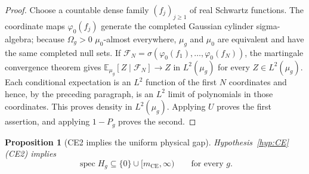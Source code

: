 \documentclass[11pt,a4paper]{article}
\newtheorem{proposition}[theorem]{Proposition}
\theoremstyle{remark}
\newcommand{\Om}{\Omega}
\newcommand{\E}{\mathbb E}
\newcommand{\CE}{\mathrm{CE}}
\DeclareMathOperator{\spec}{spec}
\begin{document}
\begin{proof}
Choose a countable dense family $(f_j)_{j\ge1}$ of real Schwartz functions.  The coordinate
maps $\varphi_0(f_j)$ generate the completed Gaussian cylinder sigma-algebra; because
$\Om_g>0$ $\mu_0$-almost everywhere, $\mu_g$ and $\mu_0$ are equivalent and have the same
completed null sets.  If $\mathcal F_N=\sigma(\varphi_0(f_1),\ldots,\varphi_0(f_N))$, the
martingale convergence theorem gives
\(
 \E_{\mu_g}[Z\mid\mathcal F_N]\to Z
\)
in $L^2(\mu_g)$ for every $Z\in L^2(\mu_g)$.  Each conditional expectation is an $L^2$
function of the first $N$ coordinates and hence, by the preceding paragraph, is an $L^2$ limit
of polynomials in those coordinates.  This proves density in $L^2(\mu_g)$.  Applying $U$ proves
the first assertion, and applying $1-P_g$ proves the second.
\end{proof}

\begin{proposition}[CE2 implies the uniform physical gap]\label{prop:gap}
Hypothesis~\ref{hyp:CE}(CE2) implies
\[
 \spec H_g\subseteq\{0\}\cup[m_{\CE},\infty)
 \qquad\text{for every }g.
\]
\end{proposition}
\end{document}
